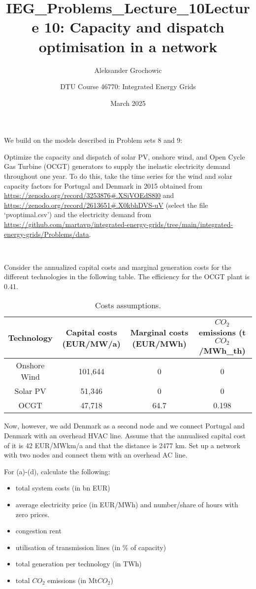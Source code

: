 \documentclass[10pt]{article}
\title{IEG_Problems_Lecture_10}
\author{Aleksander Grochowic}
\date{March 2025}
\newenvironment{problem}[2][Problem]{\begin{trivlist}
\item[\hskip \labelsep {\bfseries #1}\hskip \labelsep {\bfseries #2.}]}{\end{trivlist}}
\begin{document}
 
\title{\textbf{Lecture 10: Capacity and dispatch optimisation in a network}}
\author{
DTU Course 46770: Integrated Energy Grids }
\maketitle

\begin{problem}{10.1}
We build on the models described in Problem sets 8 and 9:

Optimize the capacity and dispatch of solar PV, onshore wind, and Open Cycle Gas Turbine (OCGT) generators to supply the inelastic electricity demand throughout one year. 
To do this, take the time series for the wind and solar capacity factors for Portugal and Denmark in 2015 obtained from \url{https://zenodo.org/record/3253876#.XSiVOEdS8l0}
and \url{https://zenodo.org/record/2613651#.X0kbhDVS-uV} (select the file ‘pvoptimal.csv’) and the electricity demand from \url{https://github.com/martavp/integrated-energy-grids/tree/main/integrated-energy-grids/Problems/data}.

\

Consider the annualized capital costs and marginal generation costs for the different technologies in the following table. The efficiency for the OCGT plant is 0.41.

\begin{table}[h]
	\centering
	\begin{tabular}{cccc}
		\hline
		Technology & Capital costs (EUR/MW/a) & Marginal costs (EUR/MWh) & $CO_2$ emissions (t$CO_2$/MWh_{th}) \\
		\hline
		Onshore Wind &  101,644 & 0 & 0 \\
		Solar PV &  51,346 & 0 & 0 \\
		OCGT & 47,718 &  64.7 & 0.198  \\
		\hline
	\end{tabular}
	\caption{Costs assumptions.}
	\label{tab:my_label}
\end{table}


Now, however, we add Denmark as a second node and we connect Portugal and Denmark with an overhead HVAC line. Assume that the annualised capital cost of it is 42 EUR/MWkm/a and that the distance is 2477 km. Set up a network with two nodes and connect them with an overhead AC line.

For (a)-(d), calculate the following:
\begin{itemize}
	\item total system costs (in bn EUR)
	\item average electricity price (in EUR/MWh) and number/share of hours with zero prices.
	\item congestion rent 
	\item utilisation of transmission lines (in \% of capacity)
	\item total generation per technology (in TWh)
	\item total $CO_2$ emissions (in Mt$CO_2$)
\end{itemize}


\end{problem}
\end{document}
